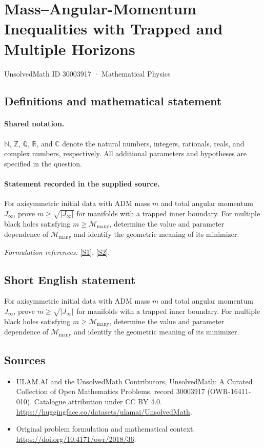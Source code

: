 \documentclass[11pt]{article}
\newcommand{\sref}[2]{\hyperlink{source:#1:#2}{[S#2]}}
\begin{document}
\setcounter{section}{30003916}
\section{Mass–Angular-Momentum Inequalities with Trapped and Multiple Horizons}\label{30003917}
{\small UnsolvedMath ID 30003917 · Mathematical Physics}
\subsection{Definitions and mathematical statement}

\paragraph{Shared notation.}$\mathbb N$, $\mathbb Z$, $\mathbb Q$, $\mathbb R$, and $\mathbb C$ denote the natural numbers, integers, rationals, reals, and complex numbers, respectively. All additional parameters and hypotheses are specified in the question.


\paragraph{Statement recorded in the supplied source.}
For axisymmetric initial data with ADM mass $m$ and total angular momentum $J_\infty$, prove $m\geq\sqrt{|J_\infty|}$ for manifolds with a trapped inner boundary. For multiple black holes satisfying $m\geq\mathcal M_{\mathrm{many}}$, determine the value and parameter dependence of $\mathcal M_{\mathrm{many}}$ and identify the geometric meaning of its minimizer.
\par\smallskip\textit{Formulation references:} \sref{30003917}{1}, \sref{30003917}{2}.
\subsection{Short English statement}
For axisymmetric initial data with ADM mass $m$ and total angular momentum $J_\infty$, prove $m\geq\sqrt{|J_\infty|}$ for manifolds with a trapped inner boundary. For multiple black holes satisfying $m\geq\mathcal M_{\mathrm{many}}$, determine the value and parameter dependence of $\mathcal M_{\mathrm{many}}$ and identify the geometric meaning of its minimizer.
\subsection{Sources}
\begin{itemize}
\item[\hypertarget{source:30003917:1}{S1}] ULAM.AI and the UnsolvedMath Contributors, UnsolvedMath: A Curated Collection of Open Mathematics Problems, record 30003917 (OWR-16411-010). Catalogue attribution under CC BY 4.0.
\url{https://huggingface.co/datasets/ulamai/UnsolvedMath}.
\item[\hypertarget{source:30003917:2}{S2}] Original problem formulation and mathematical context.
\url{https://doi.org/10.4171/owr/2018/36}.
\end{itemize}
\label{end:30003917}
\end{document}
